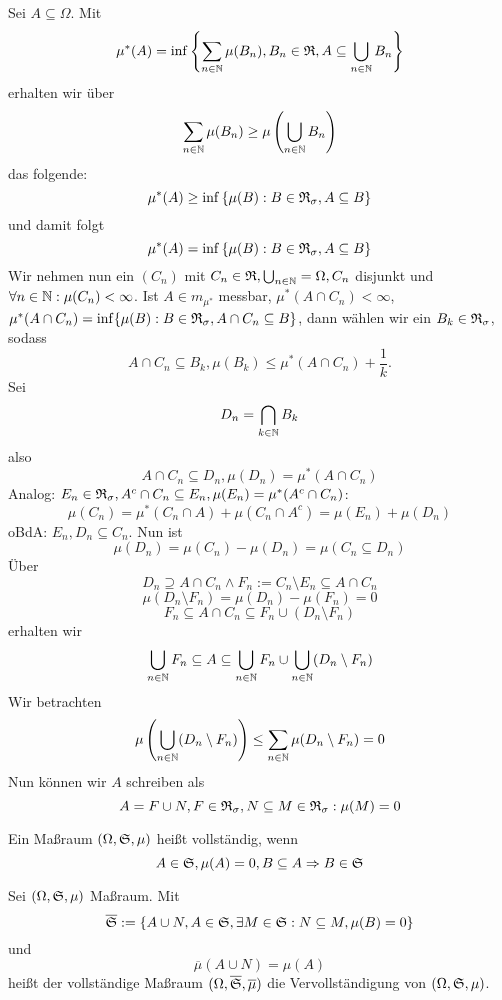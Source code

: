 			\begin{bew}
				Sei $A\subseteq \Omega$. Mit 
				\[ \mu^*(A)=\inf\left\{\sum_{n\in\mathbb{N}} \mu(B_n), B_n\in\mathfrak{R}, A\subseteq \bigcup_{n\in\mathbb{N}}B_n \right\} \]
				erhalten wir über
				\[ \sum_{n\in\mathbb{N}} \mu(B_n)\ge \mu\left(\bigcup_{n\in\mathbb{N}}B_n\right) \]
				das folgende:
				\[ \mu^*(A)\ge\inf\left\{\mu(B):B\in\mathfrak{R}_\sigma, A\subseteq B\right\} \]
				und damit folgt
				\[ \mu^*(A)=\inf\left\{\mu(B):B\in\mathfrak{R}_\sigma, A\subseteq B\right\} \]
				Wir nehmen nun ein $(C_n)$ mit $C_n\in\mathfrak{R}, \bigcup_{n\in\mathbb{N}}=\Omega, C_n$ disjunkt und $\forall n\in\mathbb{N}: \mu(C_n)<\infty$. Ist $A\in m_{\mu^*}$ messbar, $\mu^*(A\cap C_n)<\infty$, $\mu^*(A\cap C_n)=\inf\{\mu(B):B\in\mathfrak{R}_\sigma, A\cap C_n\subseteq B\}$, dann wählen wir ein $B_k\in\mathfrak{R}_\sigma$, sodass
				\[ A\cap C_n\subseteq B_k, \mu(B_k)\le \mu^*(A\cap C_n)+\frac{1}{k}. \]
				Sei 
				\[ D_n=\bigcap_{k\in\mathbb{N}} B_k\]
				also 
				\[ A\cap C_n\subseteq D_n, \mu(D_n)=\mu^*(A\cap C_n) \]
				Analog: $E_n\in\mathfrak{R}_\sigma, A^c\cap C_n\subseteq E_n, \mu(E_n)=\mu^*(A^c\cap C_n)$:
				\[ \mu(C_n)=\mu^*(C_n\cap A)+\mu(C_n\cap A^c)=\mu(E_n)+\mu(D_n) \]
				oBdA: $E_n,D_n\subseteq C_n$. Nun ist 
				\[ \mu(D_n)=\mu(C_n)-\mu(D_n)=\mu(C_n\subseteq D_n) \]
				Über
				\[ D_n\supseteq A\cap C_n \land F_n:=C_n\setminus E_n\subseteq A\cap C_n\]
				\[ \mu(D_n\setminus F_n)=\mu(D_n)-\mu(F_n)=0 \]
				\[ F_n\subseteq A\cap C_n\subseteq F_n\cup (D_n\setminus F_n) \]
				erhalten wir
				\[ \bigcup_{n\in\mathbb{N}} F_n\subseteq A\subseteq \bigcup_{n\in\mathbb{N}} F_n\cup \bigcup_{n\in\mathbb{N}}(D_n\setminus F_n) \]
				Wir betrachten
				\[ \mu\left(\bigcup_{n\in\mathbb{N}} (D_n\setminus F_n)\right)\le \sum_{n\in\mathbb{N}} \mu(D_n\setminus F_n)=0 \]
				Nun können wir $A$ schreiben als
				\[ A=F\cup N, F\in\mathfrak{R}_\sigma, N\subseteq M\in\mathfrak{R}_\sigma:\mu(M)=0 \]
			\end{bew}
			
			\begin{defi}
				Ein Maßraum $(\Omega,\mathfrak{S},\mu)$ heißt vollständig, wenn 
				\[ A\in\mathfrak{S}, \mu(A)=0, B\subseteq A\Rightarrow B\in\mathfrak{S} \]
			\end{defi}
			
			\begin{defi}
				Sei $(\Omega,\mathfrak{S}, \mu)$ Maßraum. Mit
				\[ \overline{\mathfrak{S}}:=\{A\cup N, A\in\mathfrak{S}, \exists M\in\mathfrak{S}: N\subseteq M, \mu(B)=0 \} \]
				und
				\[ \overline{\mu}(A\cup N)=\mu(A) \]
				heißt der vollständige Maßraum $(\Omega, \overline{\mathfrak{S}}, \overline{\mu})$ die Vervollständigung von $(\Omega, \mathfrak{S}, \mu)$.
			\end{defi}
			
